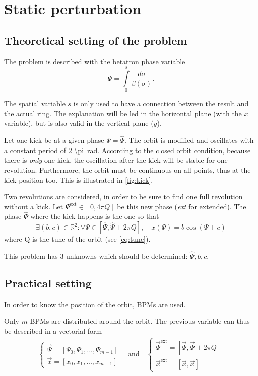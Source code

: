 \section{Static perturbation}
\label{sec:loc_static}

\subsection{Theoretical setting of the problem}
The problem is described with the betatron phase variable
\begin{equation}
\Psi = \int\limits_{0}^s \frac{d\sigma}{\beta(\sigma)}.
\end{equation}

The spatial variable $s$ is only used to have a connection between the result and the actual ring. The explanation will be led in the horizontal plane (with the $x$ variable), but is also valid in the vertical plane ($y$).

Let one kick be at a given phase $\Psi = \hat{\Psi}$. The orbit is modified and oscillates with a constant period of \SI{2 \pi}{\radian}. According to the closed orbit condition, because there is \emph{only} one kick, the oscillation after the kick will be stable for one revolution. Furthermore, the orbit must be continuous on all points, thus at the kick position too. This is illustrated in \cref{fig:kick}.

Two revolutions are considered, in order to be sure to find one full revolution without a kick. Let $\Psi^\mathrm{ext} \in [0, 4 \pi Q]$ be this new phase (\textit{ext} for extended). The phase $\hat\Psi$ where the kick happens is the one so that
\begin{equation}
\exists (b, c) \in \mathbb{R}^2:
\forall \Psi \in [\hat\Psi, \hat\Psi + 2 \pi Q], \quad
x(\Psi) = b \cos(\Psi + c)
\end{equation}
where Q is the tune of the orbit (see \cref{eq:tune}).

This problem has 3 unknowns which should be determined: $\hat\Psi, b, c$.

\subsection{Practical setting}
In order to know the position of the orbit, BPMs are used.

Only $m$ BPMs are distributed around the orbit. The previous variable can thus be described in a vectorial form
\begin{align}
\begin{cases}
\vec{\Psi} = [\Psi_0, \Psi_1, ..., \Psi_{m-1}] \\
\vec{x} = [x_0, x_1, ..., x_{m-1}]
\end{cases} \quad \mathrm{and} \quad
\begin{cases}
\vec{\Psi}^\mathrm{ext} = [\vec{\Psi}, \vec{\Psi}+2\pi Q ]\\
\vec{x}^\mathrm{ext} = [\vec{x}, \vec{x}]
\end{cases}
\end{align}

